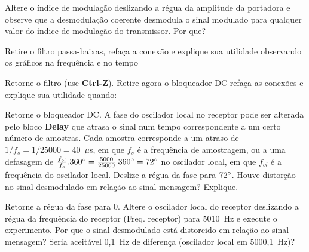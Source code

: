 \documentclass[12pt,addpoints]{exam}
\begin{document}
\begin{questions}
  

  
    \question Altere o índice de modulação deslizando a régua da amplitude da portadora e observe que a desmodulação coerente desmodula o sinal modulado para qualquer valor do índice de modulação do transmissor. Por que?
    \fillwithlines{0.5in}

   \question Retire o filtro passa-baixas, refaça a conexão e explique sua utilidade observando os gráficos na frequência e no tempo
   \fillwithlines{0.5in}

   \question Retorne o filtro (use {\bf Ctrl-Z}). Retire agora o bloqueador DC refaça as conexões e explique sua utilidade quando:
   \fillwithlines{1in}
   

    \question Retorne o bloqueador DC. A fase do oscilador local no receptor pode ser alterada pelo bloco \textbf{Delay} que atrasa o sinal num tempo correspondente a um certo número de amostras. Cada amostra corresponde a um atraso de $1/f_{s} = 1/25000 =  40$~$\mu$s, em que $f_{s}$ é a frequência de amostragem, ou a uma defasagem de $\frac{f_{ol}}{f_{s}}.360\degree = \frac{5000}{25000}.360\degree = 72\degree$ no oscilador local, em que $f_{ol}$ é a frequência do oscilador local. Deslize a régua da fase para $72\degree$. Houve distorção no sinal desmodulado em relação ao sinal mensagem? Explique.
    \fillwithlines{0.5in}
    
    \question Retorne a régua da fase para 0\degree. Altere o oscilador local do receptor deslizando a régua da frequência do receptor (Freq. receptor) para 5010~Hz e execute o experimento. Por que o sinal desmodulado está distorcido em relação ao sinal mensagem? Seria aceitável 0,1~Hz de diferença (oscilador local em 5000,1~Hz)?
    \fillwithlines{0.75in}
\end{questions}
\end{document}
